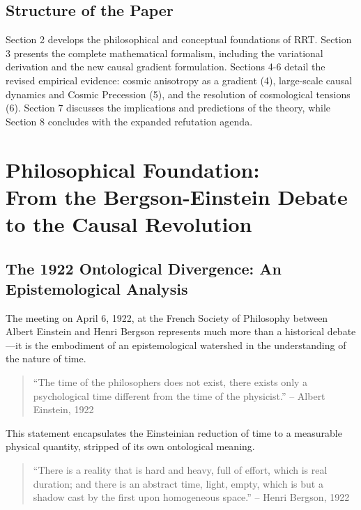 \documentclass[12pt,a4paper]{article}
\begin{document}
\subsection{Structure of the Paper}
\sloppy Section 2 develops the philosophical and conceptual foundations of RRT. Section 3 presents the complete mathematical formalism, including the variational derivation and the new causal gradient formulation. Sections 4-6 detail the revised empirical evidence: cosmic anisotropy as a gradient (4), large-scale causal dynamics and Cosmic Precession (5), and the resolution of cosmological tensions (6). Section 7 discusses the implications and predictions of the theory, while Section 8 concludes with the expanded refutation agenda.

\section{Philosophical Foundation: \texorpdfstring{\\}{}
From the Bergson-Einstein Debate to the Causal Revolution}

\subsection{The 1922 Ontological Divergence: An Epistemological Analysis}
The meeting on April 6, 1922, at the French Society of Philosophy between Albert Einstein and Henri Bergson represents much more than a historical debate—it is the embodiment of an epistemological watershed in the understanding of the nature of time.

\begin{quote}
``The time of the philosophers does not exist, there exists only a psychological time different from the time of the physicist.'' -- Albert Einstein, 1922
\end{quote}

This statement encapsulates the Einsteinian reduction of time to a measurable physical quantity, stripped of its own ontological meaning.

\begin{quote}
``There is a reality that is hard and heavy, full of effort, which is real duration; and there is an abstract time, light, empty, which is but a shadow cast by the first upon homogeneous space.'' -- Henri Bergson, 1922
\end{quote}
\end{document}
